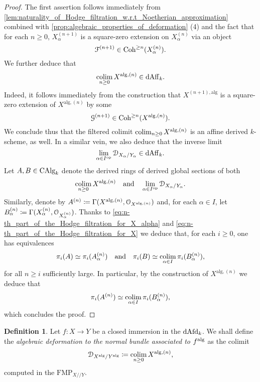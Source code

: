 \documentclass[10pt,a4paper,reqno]{amsart} %
\theoremstyle{plain}
\theoremstyle{definition}
\newtheorem{defin}[thm]{Definition}
\theoremstyle{remark}
\numberwithin{equation}{section}
\begin{document}
\begin{proof}
    The first assertion follows immediately from \cref{lem:naturality_of_Hodge_filtration_w.r.t_Noetherian_approximation} combined with \cref{prop:algebraic_properties_of_deformation} (4)
    and the fact that
    for each $n \ge 0$, $X^{(n+1)}_\alpha$ is a square-zero extension on $X^{(n)}_\alpha$ via an object
        \begin{equation} \label{eq:n-th_part_of_the_Hodge_filtration_for_X_alpha}
            \mathcal F^{(n+1)} \in \mathrm{Coh}^{\ge n}(X^{(n)}_\alpha).  
        \end{equation}
    We further deduce that
        \[
            \operatorname*{colim}_{n \ge 0} X^{\mathrm{alg}, (n)} \in \mathrm{dAff}_k.  
        \]
    Indeed, it follows immediately from the construction that $X^{(n+1), \mathrm{alg}}$ is a square-zero extension of $X^{\mathrm{alg}, (n)}$ 
    by some
        \begin{equation} \label{eq:n-th_part_of_the_Hodge_filtration_for_X}
            \mathcal G^{(n+1)} \in \mathrm{Coh}^{\ge n}(X^{\mathrm{alg}, (n)}).  
        \end{equation}
    We conclude thus that the filtered colimit $\operatorname*{colim}_{n \ge 0} X^{\mathrm{alg}, (n)}$ is an affine derived $k$-scheme, as well.
    In a similar vein, we also deduce that the inverse limit
        \[
            \lim_{\alpha \in I^\mathrm{op}} \mathcal D_{X_\alpha/ Y_\alpha} \in \mathrm{dAff}_k.  
        \]
    Let $A, B \in \mathrm{CAlg}_k$ denote the derived rings of derived global sections of both
        \[
            \operatorname*{colim}_{n \ge 0} X^{\mathrm{alg}, (n)} \quad \mathrm{and} \quad \lim_{\alpha \in I ^\mathrm{op}} \mathcal D_{X_\alpha/ Y_\alpha}.
        \]
    Similarly, denote by $A^{(n)} \coloneqq \Gamma(X^{\mathrm{alg}, (n)}, \mathcal O_{X^{\mathrm{alg}, (n)}})$ and, for each $\alpha \in I$,
    let $B^{(n)}_\alpha \coloneqq \Gamma(X_{\alpha}^{(n)}, \mathcal O_{X^{(n)}_\alpha})$.
    Thanks to \eqref{eq:n-th_part_of_the_Hodge_filtration_for_X_alpha} and \eqref{eq:n-th_part_of_the_Hodge_filtration_for_X} we deduce that,
    for each $i \ge 0$, one has equivalences
        \[
            \pi_i(A) \simeq \pi_i(A^{(n)}_{\alpha})  \quad \mathrm{and} \quad \pi_i(B) \simeq \operatorname*{colim}_{\alpha \in I} \pi_i(B^{(n)}_\alpha),
        \]
    for all $n \ge i$ sufficiently large. In particular, by the construction of $X^{\mathrm{alg}, (n)}$ we deduce that
        \[
            \pi_i(A^{(n)}) \simeq \operatorname*{colim}_{\alpha \in I} \pi_i(B_\alpha^{(n)}),
        \]
    which concludes the proof.
\end{proof}

\begin{defin}
    Let $f \colon X \to Y$ be a closed immersion in the \infcat $\mathrm{dAfd}_k$. We shall define the \emph{algebraic deformation to the normal
    bundle associated to $f^\mathrm{alg}$} as the colimit
        \[
            \mathcal D_{X^\mathrm{alg}/ Y^\mathrm{alg}}\coloneqq \operatorname*{colim}_{n \ge 0} X^{\mathrm{alg}, (n)},  
        \]
    computed in the \infcat $\mathrm{FMP}_{X/ /Y}$.
\end{defin}
\end{document}

